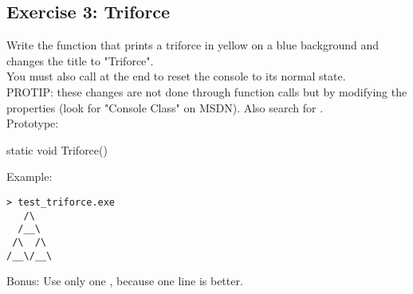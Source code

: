 \subsection{Exercise 3: Triforce}

Write the  function that prints a triforce in yellow on a blue background
and changes the title to "Triforce".\\
You must also call  at the end to reset the console to its normal state.\\
PROTIP: these changes are not done through function calls but by modifying the  properties
(look for "Console Class" on MSDN).
Also search for .\\

Prototype:
\begin{code}
static void Triforce()
\end{code}

Example:
\begin{verbatim}
> test_triforce.exe
   /\
  /__\
 /\  /\
/__\/__\
\end{verbatim}

Bonus: Use only one , because one line is better.
